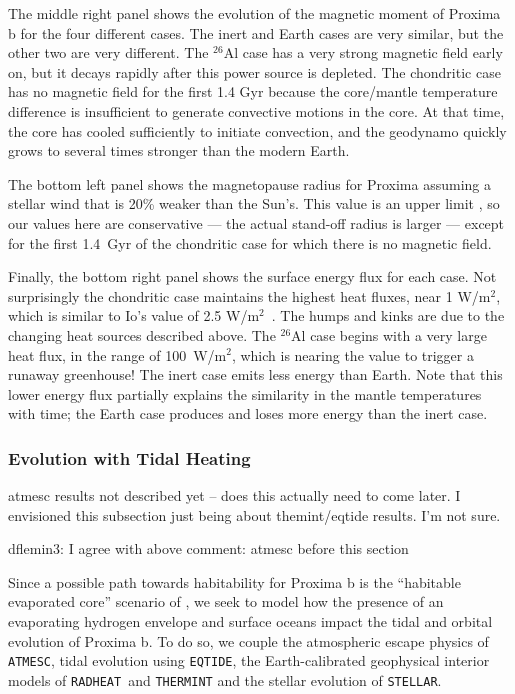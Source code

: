 \documentclass[preprint,12pt]{aastex}
\newcommand{\xxx}[1]{{\color{red} #1}} %
\def\atmesc{\texttt{\footnotesize{ATMESC}}\xspace}
\def\eqtide{\texttt{\footnotesize{EQTIDE}}\xspace}
\def\radheat{\texttt{\footnotesize{RADHEAT}}\xspace}
\def\thermint{\texttt{\footnotesize{THERMINT}}\xspace}
\def\stellar{\texttt{\footnotesize{STELLAR}}\xspace}
\begin{document}
The middle right panel shows the evolution of the magnetic moment of
Proxima b for the four different cases. The inert and Earth cases are
very similar, but the other two are very different. The $^{26}$Al case
has a very strong magnetic field early on, but it decays rapidly after
this power source is depleted. The chondritic case has no magnetic
field for the first 1.4 Gyr because the core/mantle temperature
difference is insufficient to generate convective motions in the
core. At that time, the core has cooled sufficiently to initiate
convection, and the geodynamo quickly grows to several times stronger
than the modern Earth.

The bottom left panel shows the magnetopause radius for Proxima
assuming a stellar wind that is 20\% weaker than the Sun's. This value
is an upper limit \citep{Wood01}, so our values here are conservative
--- the actual stand-off radius is larger --- except for the first
1.4~Gyr of the chondritic case for which there is no magnetic field.

Finally, the bottom right panel shows the surface energy flux for each
case. Not surprisingly the chondritic case maintains the highest heat
fluxes, near 1 W/m$^2$, which is similar to Io's value of 2.5
W/m$^2$~\citep{Veeder94}. The humps and kinks are due to the changing
heat sources described above. The $^{26}$Al case begins with a very
large heat flux, in the range of 100~W/m$^2$, which is nearing the
value to trigger a runaway greenhouse! The inert case emits less
energy than Earth. Note that this lower energy flux partially explains
the similarity in the mantle temperatures with time; the Earth case
produces and loses more energy than the inert case.

\subsubsection{Evolution with Tidal Heating}
\label{sec:results:internal:tides}

\xxx{atmesc results not described yet -- does this actually need to come later. I envisioned this subsection just being about themint/eqtide results. I'm not sure.}

\xxx{dflemin3: I agree with above comment: atmesc before this section} 

Since a possible path towards habitability for Proxima b is the
``habitable evaporated core'' scenario of \citet{Luger15}, we seek to
model how the presence of an evaporating hydrogen envelope and surface
oceans impact the tidal and orbital evolution of Proxima b.  To do so,
we couple the atmospheric escape physics of \atmesc, tidal evolution
using \eqtide, the Earth-calibrated geophysical interior models of
\radheat \ and \thermint and the stellar evolution of \stellar.
\end{document}
